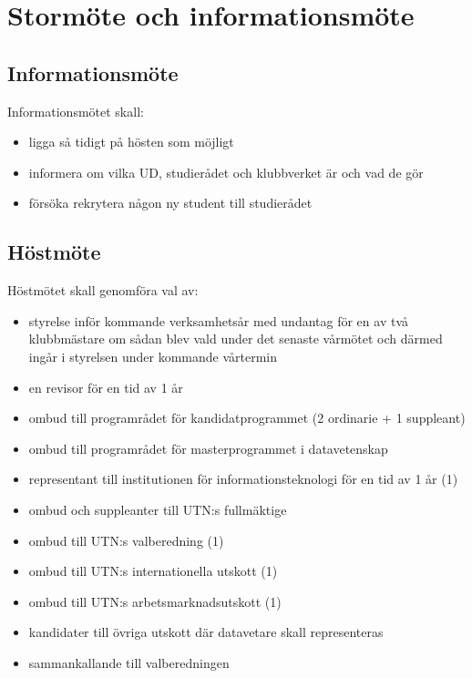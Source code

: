 \documentclass[a4paper]{article}
\begin{document}
\section{Stormöte och informationsmöte}
\subsection{Informationsmöte}
  Informationsmötet skall:
  \begin{itemize}
    \item ligga så tidigt på hösten som möjligt
    \item informera om vilka UD, studierådet och klubbverket är och vad de gör
    \item försöka rekrytera någon ny student till studierådet
  \end{itemize}
  \subsection{Höstmöte}
  Höstmötet skall genomföra val av:
  \begin{itemize}
    \item styrelse inför kommande verksamhetsår med undantag för en av två klubbmästare om sådan blev vald under det senaste vårmötet och därmed ingår i styrelsen under kommande vårtermin
    \item en revisor för en tid av 1 år
    \item ombud till programrådet för kandidatprogrammet (2 ordinarie + 1 suppleant)
    \item ombud till programrådet för masterprogrammet i datavetenskap
    \item representant till institutionen för informationsteknologi för en tid av 1 år (1)
    \item ombud och suppleanter till UTN:s fullmäktige
    \item ombud till UTN:s valberedning (1)
    \item ombud till UTN:s internationella utskott (1)
    \item ombud till UTN:s arbetsmarknadsutskott (1)
    \item kandidater till övriga utskott där datavetare skall representeras
    \item sammankallande till valberedningen
  \end{itemize}
\end{document}
